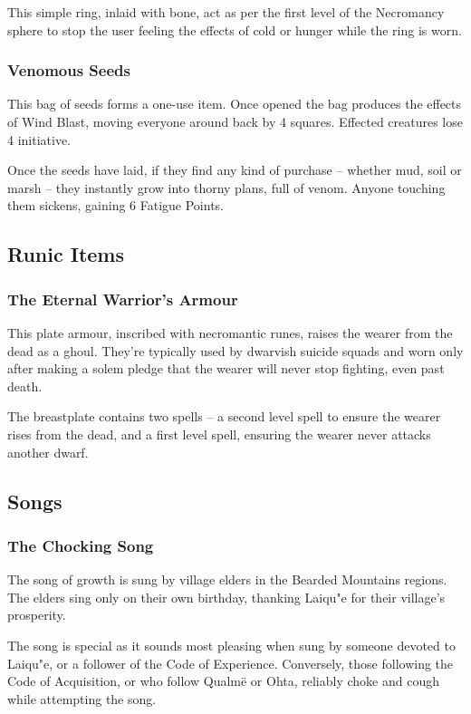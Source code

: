 \begin{multicols}{2}
This simple ring, inlaid with bone, act as per the first level of the Necromancy sphere to stop the user feeling the effects of cold or hunger while the ring is worn.

\subsubsection{Venomous Seeds}

This bag of seeds forms a one-use item.  Once opened the bag produces the effects of Wind Blast, moving everyone around back by 4 squares.  Effected creatures lose 4 initiative.

Once the seeds have laid, if they find any kind of purchase -- whether mud, soil or marsh -- they instantly grow into thorny plans, full of venom.  Anyone touching them sickens, gaining 6 Fatigue Points.

\subsection{Runic Items}

\subsubsection{The Eternal Warrior's Armour}

This plate armour, inscribed with necromantic runes, raises the wearer from the dead as a ghoul.  They're typically used by dwarvish suicide squads and worn only after making a solem pledge that the wearer will never stop fighting, even past death.

The breastplate contains two spells -- a second level spell to ensure the wearer rises from the dead, and a first level spell, ensuring the wearer never attacks another dwarf.

\subsection{Songs}

\subsubsection{The Chocking Song}
The song of growth is sung by village elders in the Bearded Mountains regions.  The elders sing only on their own birthday, thanking Laiqu"{e} for their village's prosperity.

The song is special as it sounds most pleasing when sung by someone devoted to Laiqu"{e}, or a follower of the Code of Experience.  Conversely, those following the Code of Acquisition, or who follow Qualm\"{e} or Ohta, reliably choke and cough while attempting the song.


\end{multicols}
